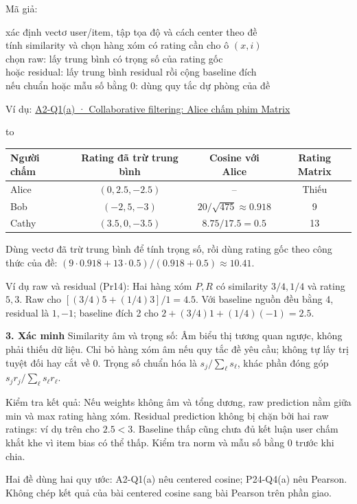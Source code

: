\documentclass[10pt,a4paper,twocolumn]{article}
\makeatletter
\newcommand{\key}[1]{#1:\enspace}
\newcommand{\blocklabel}[1]{\par\noindent#1\par\nobreak}
\newcommand{\qlink}[2]{\hyperref[question:#1]{#2}}
\newenvironment{example}[2]{%
  \par\addvspace{6pt}\noindent
  \raggedright
  \blocklabel{Ví dụ: \qlink{#1}{#2}}%
}{\par\addvspace{4pt}}
\newenvironment{examtable}[1]{%
  \par\addvspace{2pt}\noindent\hbox to \linewidth\bgroup\hfil
  \setlength{\tabcolsep}{4pt}%
  \renewcommand{\arraystretch}{1.12}\begin{tabular}{#1}%
}{\end{tabular}\hfil\egroup\par\addvspace{2pt}}
\newcommand{\unitheading}[2]{%
  \par\addvspace{1pt}\noindent\textbf{#1. #2}\enspace}
\newcommand{\unitverification}{\unitheading{3}{Xác minh}}
\newenvironment{algpseudo}{%
  \par\addvspace{2pt}\noindent
  \setlength{\parskip}{0pt}%
  Mã giả:\par\nobreak
  \begin{list}{}{\setlength{\leftmargin}{1em}\setlength{\topsep}{0pt}%
    \setlength{\partopsep}{0pt}\setlength{\parsep}{0pt}%
    \@beginparpenalty=10000\relax}%
  \item\relax
}{\end{list}\par\addvspace{3pt}}
\makeatother
\begin{document}
\begin{algpseudo}
xác định vectơ user/item, tập tọa độ và cách center theo đề\\
tính similarity và chọn hàng xóm có rating cần cho ô $(x,i)$\\
chọn raw: lấy trung bình có trọng số của rating gốc\\
hoặc residual: lấy trung bình residual rồi cộng baseline đích\\
nếu chuẩn hoặc mẫu số bằng 0: dùng quy tắc dự phòng của đề
\end{algpseudo}

\begin{example}{A2-Q1}{A2-Q1(a) · Collaborative filtering: Alice chấm phim Matrix}
\begin{examtable}{@{}l c c c@{}}
\toprule
Người chấm & Rating đã trừ trung bình & Cosine với Alice & Rating Matrix \\
\midrule
Alice & $(0,2.5,-2.5)$ & -- & Thiếu \\
Bob & $(-2,5,-3)$ & $20/\sqrt{475}\approx0.918$ & 9 \\
Cathy & $(3.5,0,-3.5)$ & $8.75/17.5=0.5$ & 13 \\
\bottomrule
\end{examtable}
Dùng vectơ đã trừ trung bình để tính trọng số, rồi dùng rating gốc theo công thức của đề: $(9\cdot0.918+13\cdot0.5)/(0.918+0.5)\approx10.41$.
\end{example}

\key{Ví dụ raw và residual (Pr14)} Hai hàng xóm $P,R$ có similarity $3/4,1/4$ và rating $5,3$. Raw cho $[(3/4)5+(1/4)3]/1=4.5$. Với baseline nguồn đều bằng 4, residual là $1,-1$; baseline đích 2 cho $2+(3/4)1+(1/4)(-1)=2.5$.

\unitverification
\key{Similarity âm và trọng số} Âm biểu thị tương quan ngược, không phải thiếu dữ liệu. Chỉ bỏ hàng xóm âm nếu quy tắc đề yêu cầu; không tự lấy trị tuyệt đối hay cắt về 0. Trọng số chuẩn hóa là $s_j/\sum_\ell s_\ell$, khác phần đóng góp $s_jr_j/\sum_\ell s_\ell r_\ell$.

\key{Kiểm tra kết quả} Nếu weights không âm và tổng dương, raw prediction nằm giữa min và max rating hàng xóm. Residual prediction không bị chặn bởi hai raw ratings: ví dụ trên cho $2.5<3$. Baseline thấp cũng chưa đủ kết luận user chấm khắt khe vì item bias có thể thấp. Kiểm tra norm và mẫu số bằng 0 trước khi chia.

\key{Hai đề dùng hai quy ước} A2-Q1(a) nêu centered cosine; P24-Q4(a) nêu Pearson. Không chép kết quả của bài centered cosine sang bài Pearson trên phần giao.
\end{document}
